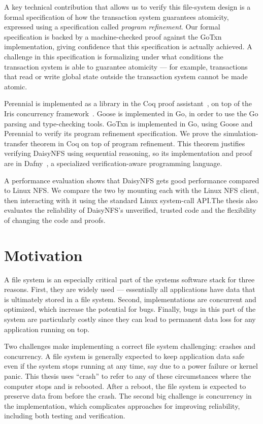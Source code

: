 A key technical contribution that allows us to verify this file-system design is
a formal specification of how the transaction system guarantees atomicity,
expressed using a specification called \emph{program refinement}. Our
formal specification is backed by a machine-checked proof against the GoTxn
implementation, giving confidence that this specification is actually achieved.
A challenge in this specification is formalizing under what conditions the
transaction system is able to guarantee atomicity --- for example, transactions
that read or write global state outside the transaction system cannot be made atomic.

Perennial is implemented as a library in the Coq proof assistant~\cite{coq}, on
top of the Iris concurrency framework~\cite{jung:iris-jfp}. Goose is implemented
in Go, in order to use the Go parsing and type-checking tools. GoTxn is
implemented in Go, using Goose and Perennial to verify its program refinement
specification. We prove the simulation-transfer theorem in Coq on top of program
refinement. This theorem justifies verifying DaisyNFS using sequential
reasoning, so its implementation and proof are in Dafny~\cite{dafny-refman}, a
specialized verification-aware programming language.

A performance evaluation shows that DaisyNFS gets good performance compared to
Linux NFS. We compare the two by mounting each with the Linux NFS client, then
interacting with it using the standard Linux system-call API.\@ The thesis also
evaluates the reliability of DaisyNFS's unverified, trusted code and the
flexibility of changing the code and proofs.

\section{Motivation}

A file system is an especially critical part of the systems software stack for
three reasons. First, they are widely used --- essentially all applications have
data that is ultimately stored in a file system. Second, implementations are
concurrent and optimized, which increase the potential for bugs. Finally, bugs
in this part of the system are particularly costly since they can lead to
permanent data loss for any application running on top.

Two challenges make implementing a correct file system challenging: crashes and
concurrency. A file system is generally expected to keep application data safe
even if the system stops running at any time, say due to a power failure or
kernel panic. This thesis uses ``crash'' to refer to any of these circumstances
where the computer stops and is rebooted. After a reboot, the file system is
expected to preserve data from before the crash. The second big challenge is
concurrency in the implementation, which complicates approaches for improving
reliability, including both testing and verification.

